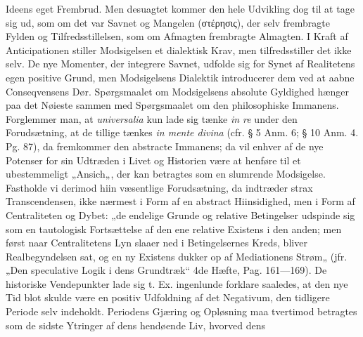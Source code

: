 \documentclass[12pt]{book}
\newcommand{\opage}[1]{\marginnote{\footnotesize\textit{[#1]}}}
\begin{document}
Ideens eget Frembrud. Men desuagtet kommer den hele Udvikling dog til at tage sig ud,
som om det var Savnet og Mangelen (στέρησις), der selv frembragte Fylden og
Tilfredsstillelsen, som om Afmagten frembragte Almagten. I Kraft af Anticipationen
stiller Modsigelsen et dialektisk Krav, men tilfredsstiller det ikke selv. De nye
Momenter, der integrere Savnet, udfolde sig for Synet af Realitetens egen positive
Grund, men Modsigelsens Dialektik introducerer dem ved at aabne Conseqvensens Dør.
Spørgsmaalet om Modsigelsens absolute Gyldighed hænger paa det Nøieste sammen med
Spørgsmaalet om den philosophiske Immanens. Forglemmer man, at \textit{universalia}
kun lade sig tænke \textit{in re} under den Forudsætning, at de tillige tænkes
\textit{in mente divina} (cfr. § 5 Anm. 6; § 10 Anm. 4. Pg. 87), da fremkommer den
abstracte Immanens; da vil enhver af de nye Potenser for sin Udtræden i Livet og
Historien være at henføre til et ubestemmeligt „Ansich„, der kan betragtes som en
slumrende Modsigelse. Fastholde vi derimod hiin væsentlige Forudsætning, da indtræder
strax Transcendensen, ikke nærmest i Form af en abstract Hiinsidighed, men i Form af
Centraliteten og Dybet: „de endelige Grunde og relative Betingelser udspinde sig som
en tautologisk Fortsættelse af den ene relative Existens i den anden; men først naar
Centralitetens Lyn slaaer ned i Betingelsernes Kreds, bliver Realbegyndelsen sat, og
en ny Existens dukker op af Mediationens Strøm„ (jfr. „Den speculative Logik i dens
Grundtræk“ 4de Hæfte, Pag. 161---169). De historiske Vendepunkter lade sig t. Ex.
ingenlunde forklare saaledes, at den nye Tid blot skulde være en positiv Udfoldning af
det Negativum, den tidligere Periode selv indeholdt. Periodens Gjæring og Opløsning
maa tvertimod betragtes som de sidste Ytringer af dens hendøende Liv, hvorved dens
\opage{112} %
%
\end{document}
